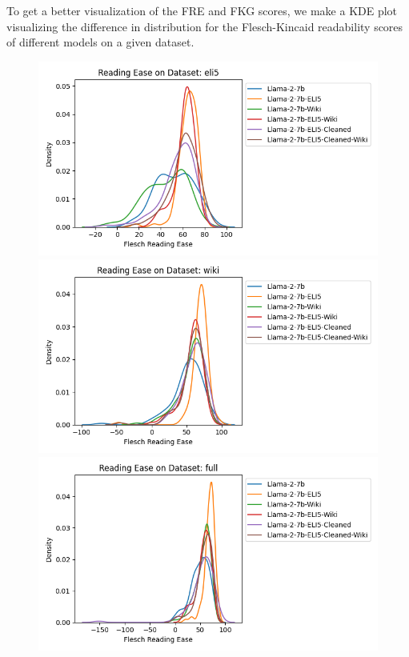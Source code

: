 \documentclass[11pt, oneside]{article}   	%
\begin{document}
To get a better visualization of the FRE and FKG scores, we make a KDE plot visualizing the difference in distribution for the Flesch-Kincaid readability scores of different models on a given dataset.
\begin{figure}
\includegraphics[scale=.5]{./figures/FRE_7B_ELI5.png}
\includegraphics[scale=.5]{./figures/FRE_7B_Wiki.png}
\\
\includegraphics[scale=.5]{./figures/FRE_7B_full.png}

\end{figure}
\end{document}
